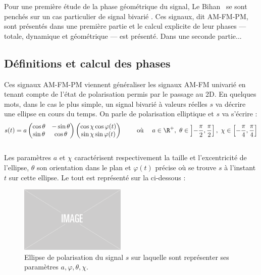 Pour une première étude de la phase géométrique du signal, Le Bihan \etal~se sont penchés sur un cas particulier de signal bivarié \cite{flamant_timefrequency_2019,le_bihan_modephysiques_2023, le_bihan_geometric_2024}. Ces signaux, dit AM-FM-PM, sont présentés dans une première partie et le calcul explicite de leur phases --- totale, dynamique et géométrique --- est présenté. Dans une seconde partie... 
\\



\subsection{Définitions et calcul des phases} \label{subsec:AM-FM-PM}

Ces signaux AM-FM-PM viennent généraliser les signaux AM-FM univarié en tenant compte de l'état de polarisation permis par le passage au 2D. 
En quelques mots, dans le cas le plus simple, un signal bivarié à valeurs réelles $s$ va décrire une ellipse en cours du temps. 
On parle de polarisation elliptique et $s$ va s'écrire :
\[s(t) = a \begin{pmatrix} \cos\theta & -\sin\theta \\ \sin\theta  &  \cos\theta \end{pmatrix} \begin{pmatrix} \cos\chi \cos\varphi(t) \\ \sin\chi \sin\varphi(t) \end{pmatrix}  \qquad \text{ où }\quad  a\in\R^+,\ \theta \in \left]-\frac{\pi}{2}, \frac{\pi}{2}\right],\ \chi \in \left[-\frac{\pi}{4}, \frac{\pi}{4}\right] \]
\\
Les paramètres $a$ et $\chi$ caractérisent respectivement la taille et l'excentricité de l'ellipse, $\theta$ son orientation dans le plan et $\varphi(t)$ précise où se trouve $s$ à l'instant $t$ sur cette ellipse. 
Le tout est représenté sur la  ci-dessous :
\begin{figure}[h]
	\includegraphics[width=0.45\textwidth]{fig/placeholder}
	\caption[Ellipse de polarisation d'un signal bivarié réel]{Ellipse de polarisation du signal $s$ sur laquelle sont représenter ses paramètres $a,\varphi,\theta,\chi$.}
	\label{fig:ellipse2polat}
\end{figure}
